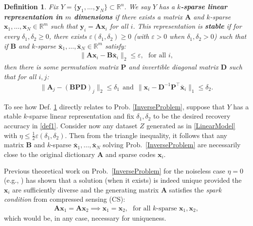 \documentclass[9pt,twocolumn]{pnas-new}
\newtheorem{definition}{Definition}
\begin{document}
\begin{definition}\label{maindef}
Fix $Y = \{ \mathbf{y}_1, \ldots, \mathbf{y}_N\} \subset \mathbb{R}^n$. We say $Y$ has a \textbf{$k$-sparse linear representation in $m$ dimensions} if there exists a matrix $\mathbf{A}$ and $k$-sparse $\mathbf{x}_1, \ldots, \mathbf{x}_N \in \mathbb{R}^m$ such that $\mathbf{y}_i = \mathbf{A}\mathbf{x}_i$ for all $i$. %
This representation is \textbf{stable} if for every $\delta_1, \delta_2 \geq 0$, there exists $\varepsilon(\delta_1, \delta_2) \geq 0$ (with $\varepsilon > 0$ when  $\delta_1, \delta_2 > 0$) such that if $\mathbf{B}$ and $k$-sparse $\mathbf{\bar x}_1, \ldots, \mathbf{\bar x}_N \in \mathbb{R}^m$ satisfy:
\begin{align*}
\|\mathbf{A}\mathbf{x}_i - \mathbf{B}\mathbf{\bar x}_i\|_2 \leq \varepsilon,\ \ \   \text{for all $i$},
\end{align*}
%
then there is some permutation matrix $\mathbf{P}$ and invertible diagonal matrix $\mathbf{D}$ such that for all $i, j$:
\begin{align}\label{def1}
\|\mathbf{A}_j - (\mathbf{BPD})_j\|_2 \leq \delta_1 \ \ \text{and} \ \ \|\mathbf{x}_i - \mathbf{D}^{-1}\mathbf{P}^{\top}\mathbf{\bar x}_i\|_1 \leq \delta_2.
\end{align}
\end{definition}

To see how Def. \ref{maindef} directly relates to Prob. \ref{InverseProblem}, suppose that $Y$
has a stable $k$-sparse linear representation and fix $\delta_1, \delta_2$ to be the desired recovery accuracy in \eqref{def1}. Consider now any dataset $Z$ generated as in \eqref{LinearModel} with $\eta \leq \frac{1}{2} \varepsilon(\delta_1, \delta_2)$. Then from the triangle inequality, it follows that any matrix $\mathbf{B}$ and $k$-sparse $\mathbf{\bar x}_1, \ldots, \mathbf{\bar x}_N$ solving Prob.~\ref{InverseProblem} are necessarily close to the original dictionary $\mathbf{A}$ and sparse codes $\mathbf{x}_i$. 

Previous theoretical work on Prob.~\ref{InverseProblem} for the noiseless case $\eta =0$ (e.g., \cite{li2004analysis, Georgiev05, Aharon06, Hillar15}) has shown that a solution (when it exists) is indeed unique provided the $\mathbf{x}_i$ are sufficiently diverse and the generating matrix $\mathbf{A}$ satisfies the \textit{spark condition} from compressed sensing (CS):
\begin{align}\label{SparkCondition}
\mathbf{A}\mathbf{x}_1 = \mathbf{A}\mathbf{x}_2 \implies \mathbf{x}_1 = \mathbf{x}_2, \ \ \ \text{for all $k$-sparse } \mathbf{x}_1, \mathbf{x}_2,
\end{align}
%
which would be, in any case, necessary for uniqueness.
\end{document}
